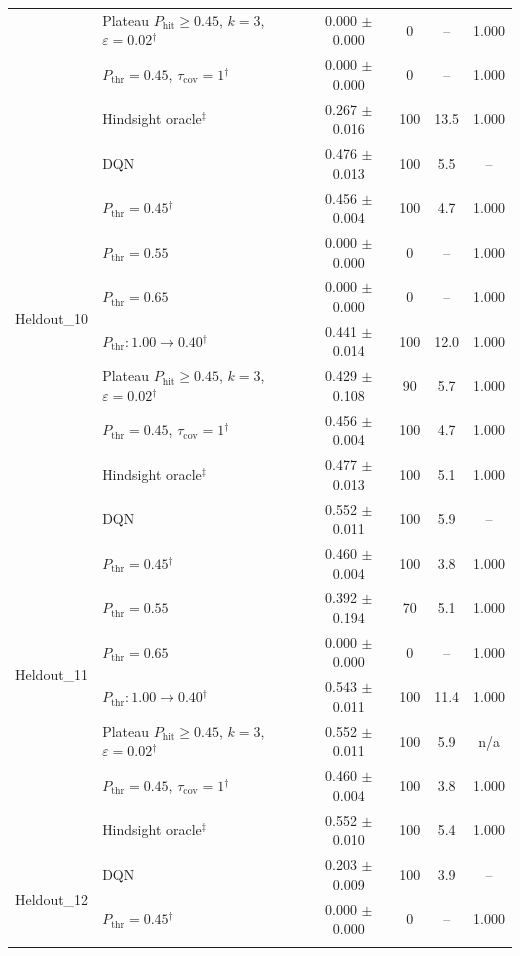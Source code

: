 \begin{table}[htbp]
\begin{tabular}{llcccc}
 & Plateau $P_{\mathrm{hit}}\geq0.45$, $k=3$, $\varepsilon=0.02$$^{\dagger}$ & 0.000 $\pm$ 0.000 & 0 & -- & 1.000 \\
 & $P_{\mathrm{thr}}=0.45$, $\tau_{\mathrm{cov}}=1$$^{\dagger}$ & 0.000 $\pm$ 0.000 & 0 & -- & 1.000 \\
 & Hindsight oracle$^{\ddagger}$ & 0.267 $\pm$ 0.016 & 100 & 13.5 & 1.000 \\
\midrule
\multirow{8}{*}{Heldout\_10} & DQN & 0.476 $\pm$ 0.013 & 100 & 5.5 & -- \\
 & $P_{\mathrm{thr}}=0.45$$^{\dagger}$ & 0.456 $\pm$ 0.004 & 100 & 4.7 & 1.000 \\
 & $P_{\mathrm{thr}}=0.55$ & 0.000 $\pm$ 0.000 & 0 & -- & 1.000 \\
 & $P_{\mathrm{thr}}=0.65$ & 0.000 $\pm$ 0.000 & 0 & -- & 1.000 \\
 & $P_{\mathrm{thr}}: 1.00 \to 0.40$$^{\dagger}$ & 0.441 $\pm$ 0.014 & 100 & 12.0 & 1.000 \\
 & Plateau $P_{\mathrm{hit}}\geq0.45$, $k=3$, $\varepsilon=0.02$$^{\dagger}$ & 0.429 $\pm$ 0.108 & 90 & 5.7 & 1.000 \\
 & $P_{\mathrm{thr}}=0.45$, $\tau_{\mathrm{cov}}=1$$^{\dagger}$ & 0.456 $\pm$ 0.004 & 100 & 4.7 & 1.000 \\
 & Hindsight oracle$^{\ddagger}$ & 0.477 $\pm$ 0.013 & 100 & 5.1 & 1.000 \\
\midrule
\multirow{8}{*}{Heldout\_11} & DQN & 0.552 $\pm$ 0.011 & 100 & 5.9 & -- \\
 & $P_{\mathrm{thr}}=0.45$$^{\dagger}$ & 0.460 $\pm$ 0.004 & 100 & 3.8 & 1.000 \\
 & $P_{\mathrm{thr}}=0.55$ & 0.392 $\pm$ 0.194 & 70 & 5.1 & 1.000 \\
 & $P_{\mathrm{thr}}=0.65$ & 0.000 $\pm$ 0.000 & 0 & -- & 1.000 \\
 & $P_{\mathrm{thr}}: 1.00 \to 0.40$$^{\dagger}$ & 0.543 $\pm$ 0.011 & 100 & 11.4 & 1.000 \\
 & Plateau $P_{\mathrm{hit}}\geq0.45$, $k=3$, $\varepsilon=0.02$$^{\dagger}$ & 0.552 $\pm$ 0.011 & 100 & 5.9 & n/a \\
 & $P_{\mathrm{thr}}=0.45$, $\tau_{\mathrm{cov}}=1$$^{\dagger}$ & 0.460 $\pm$ 0.004 & 100 & 3.8 & 1.000 \\
 & Hindsight oracle$^{\ddagger}$ & 0.552 $\pm$ 0.010 & 100 & 5.4 & 1.000 \\
\midrule
\multirow{8}{*}{Heldout\_12} & DQN & 0.203 $\pm$ 0.009 & 100 & 3.9 & -- \\
 & $P_{\mathrm{thr}}=0.45$$^{\dagger}$ & 0.000 $\pm$ 0.000 & 0 & -- & 1.000 \\
$$
\end{tabular}
\end{table}
